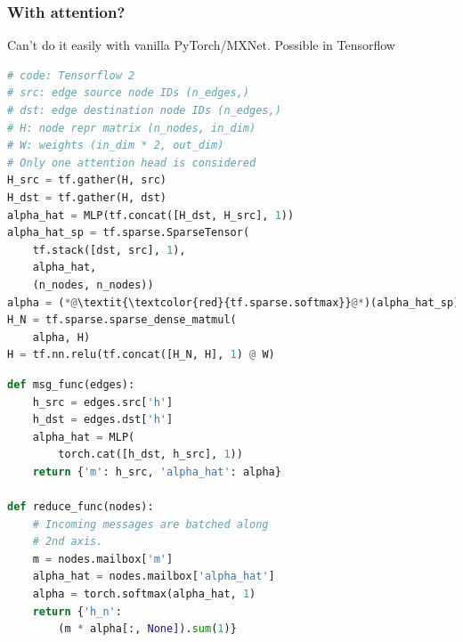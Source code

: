 \documentclass[10pt,aspectratio=169]{beamer}
\begin{document}
	\begin{frame}[fragile]
		\frametitle{With attention?}
		Can't do it easily with vanilla PyTorch/MXNet.  Possible in Tensorflow
		\begin{minipage}{0.5\textwidth}
\begin{lstlisting}[language=Python]
# code: Tensorflow 2
# src: edge source node IDs (n_edges,)
# dst: edge destination node IDs (n_edges,)
# H: node repr matrix (n_nodes, in_dim)
# W: weights (in_dim * 2, out_dim)
# Only one attention head is considered
H_src = tf.gather(H, src)
H_dst = tf.gather(H, dst)
alpha_hat = MLP(tf.concat([H_dst, H_src], 1))
alpha_hat_sp = tf.sparse.SparseTensor(
    tf.stack([dst, src], 1),
    alpha_hat,
    (n_nodes, n_nodes))
alpha = (*@\textit{\textcolor{red}{tf.sparse.softmax}}@*)(alpha_hat_sp)
H_N = tf.sparse.sparse_dense_matmul(
    alpha, H)
H = tf.nn.relu(tf.concat([H_N, H], 1) @ W)
\end{lstlisting}
		\end{minipage}%
		\begin{minipage}{0.5\textwidth}
\begin{lstlisting}[language=Python]
def msg_func(edges):
    h_src = edges.src['h']
    h_dst = edges.dst['h']
    alpha_hat = MLP(
        torch.cat([h_dst, h_src], 1))
    return {'m': h_src, 'alpha_hat': alpha}

def reduce_func(nodes):
    # Incoming messages are batched along
    # 2nd axis.
    m = nodes.mailbox['m']
    alpha_hat = nodes.mailbox['alpha_hat']
    alpha = torch.softmax(alpha_hat, 1)
    return {'h_n':
        (m * alpha[:, None]).sum(1)}
\end{lstlisting}
		\end{minipage}
	\end{frame}
\end{document}

